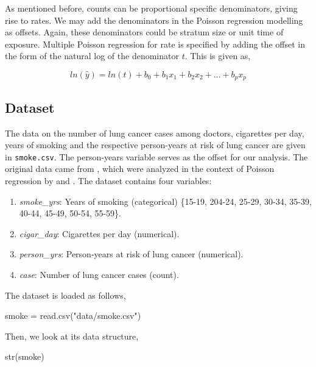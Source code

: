 \documentclass[
  10pt,
]{krantz}
\newenvironment{Shaded}{\begin{snugshade}}{\end{snugshade}}
\newcommand{\FunctionTok}[1]{\textcolor[rgb]{0.00,0.00,0.00}{#1}}
\newcommand{\NormalTok}[1]{#1}
\newcommand{\OtherTok}[1]{\textcolor[rgb]{0.56,0.35,0.01}{#1}}
\newcommand{\StringTok}[1]{\textcolor[rgb]{0.31,0.60,0.02}{#1}}
\providecommand{\tightlist}{%
  \setlength{\itemsep}{0pt}\setlength{\parskip}{0pt}}
\begin{document}
As mentioned before, counts can be proportional specific denominators, giving rise to rates. We may add the denominators in the Poisson regression modelling as offsets. Again, these denominators could be stratum size or unit time of exposure. Multiple Poisson regression for rate is specified by adding the offset in the form of the natural log of the denominator \(t\). This is given as,

\[ln(\hat y) = ln(t) + b_0 + b_1x_1 + b_2x_2 + ... + b_px_p\]

\hypertarget{dataset-4}{%
\subsection{Dataset}\label{dataset-4}}

The data on the number of lung cancer cases among doctors, cigarettes per day, years of smoking and the respective person-years at risk of lung cancer are given in \texttt{smoke.csv}. The person-years variable serves as the offset for our analysis. The original data came from \citet{Doll1971}, which were analyzed in the context of Poisson regression by \citet{Frome1983} and \citet{fleiss2003}. The dataset contains four variables:

\begin{enumerate}
\def\labelenumi{\arabic{enumi}.}
\tightlist
\item
  \emph{smoke\_yrs}: Years of smoking (categorical) \{15-19, 204-24, 25-29, 30-34, 35-39, 40-44, 45-49, 50-54, 55-59\}.
\item
  \emph{cigar\_day}: Cigarettes per day (numerical).
\item
  \emph{person\_yrs}: Person-years at risk of lung cancer (numerical).
\item
  \emph{case}: Number of lung cancer cases (count).
\end{enumerate}

The dataset is loaded as follows,

\begin{Shaded}
\begin{Highlighting}[]
\NormalTok{smoke }\OtherTok{=} \FunctionTok{read.csv}\NormalTok{(}\StringTok{"data/smoke.csv"}\NormalTok{)}
\end{Highlighting}
\end{Shaded}

Then, we look at its data structure,

\begin{Shaded}
\begin{Highlighting}[]
\FunctionTok{str}\NormalTok{(smoke)}
\end{Highlighting}
\end{Shaded}
\end{document}
